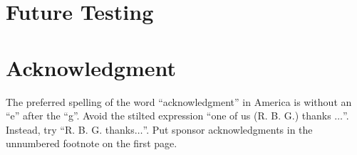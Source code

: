 \documentclass[conference]{IEEEtran}
\begin{document}
\section{Future Testing}


\section*{Acknowledgment}

The preferred spelling of the word ``acknowledgment'' in America is without 
an ``e'' after the ``g''. Avoid the stilted expression ``one of us (R. B. 
G.) thanks $\ldots$''. Instead, try ``R. B. G. thanks$\ldots$''. Put sponsor 
acknowledgments in the unnumbered footnote on the first page.





\end{document}
